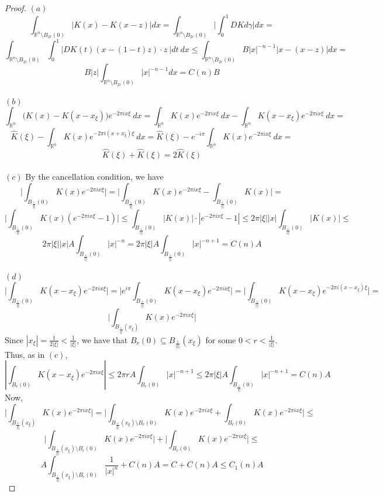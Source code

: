 \documentclass[12pt]{article}
\begin{document}
\begin{proof}
  $(a)$
  $$\int_{\mathbb{R}^n \setminus B_{2r}(0)} |K(x) - K(x-z)| dx = \int_{\mathbb{R}^n \setminus B_{2r}(0)} \Big| \int_{0}^{1} DK d\gamma \Big| dx =$$
  $$\int_{\mathbb{R}^n \setminus B_{2r}(0)} \int_{0}^{1} \Big|DK(t)(x-(1-t)z) \cdot z\ \Big| dt\ dx \le \int_{\mathbb{R}^n \setminus B_{2r}(0)} B |x|^{-n-1} |x - (x-z)| dx =$$
  $$B |z| \int_{\mathbb{R}^n \setminus B_{2r}(0)} |x|^{-n-1}dx = C(n)B$$\\
  $(b)$
  $$\int_{\mathbb{R}^n} \Big( K(x) - K(x - x_{\xi}) \Big) e^{-2 \pi i x \xi}\ dx = \int_{\mathbb{R}^n} K(x) e^{-2 \pi i x \xi}\ dx - \int_{\mathbb{R}^n} K(x-x_\xi) e^{-2 \pi i x \xi}\ dx =$$
  $$\hat{K}(\xi) - \int_{\mathbb{R}^n} K(x) e^{-2 \pi i (x + x_\xi) \xi}\ dx = \hat{K}(\xi) - e^{-i \pi} \int_{\mathbb{R}^n} K(x) e^{-2 \pi i x \xi}\ dx =$$
  $$\hat{K}(\xi) + \hat{K}(\xi) = 2 \hat{K}(\xi)$$\\
  $(c)$ By the  cancellation condition, we have
  $$\Big| \int_{B_\frac{1}{|\xi|}(0)} K(x)e^{-2 \pi i x \xi} \Big| = \Big| \int_{B_\frac{1}{|\xi|}(0)} K(x)e^{-2 \pi i x \xi} - \int_{B_\frac{1}{|\xi|}(0)} K(x) \Big| =$$
  $$\Big| \int_{B_\frac{1}{|\xi|}(0)} K(x)(e^{-2 \pi i x \xi} - 1) \Big| \le \int_{B_\frac{1}{|\xi|}(0)} |K(x)|\cdot |e^{-2 \pi i x \xi} - 1| \le 2\pi|\xi||x| \int_{B_\frac{1}{|\xi|}(0)} |K(x)| \le$$
  $$2\pi|\xi||x| A \int_{B_\frac{1}{|\xi|}(0)} |x|^{-n} = 2\pi|\xi| A \int_{B_\frac{1}{|\xi|}(0)} |x|^{-n+1} = C(n)A$$\\
  $(d)$
  $$\Big| \int_{B_\frac{1}{|\xi|}(0)} K(x-x_\xi)e^{-2 \pi i x \xi} \Big| = \Big| e^{i\pi}\int_{B_\frac{1}{|\xi|}(0)} K(x-x_\xi)e^{-2 \pi i x \xi} \Big| = \Big| \int_{B_\frac{1}{|\xi|}(0)} K(x-x_\xi)e^{-2 \pi i (x-x_{\xi}) \xi} \Big| =$$
  $$\Big| \int_{B_{\frac{1}{|\xi|}}(x_\xi)} K(x)e^{-2 \pi i x \xi} \Big|$$
  Since $|x_\xi| = \frac{1}{2|\xi|} < \frac{1}{|\xi|}$, we have that $B_{r}(0) \subseteq B_{\frac{1}{|\xi|}}(x_\xi)$ for some $0 < r < \frac{1}{|\xi|}$. Thus, as in $(c)$,
  $$|\int_{B_r(0)} K(x-x_\xi)e^{-2 \pi i x \xi}| \le 2\pi r A \int_{B_r(0)} |x|^{-n+1} \le 2\pi|\xi| A \int_{B_\frac{1}{|\xi|}(0)} |x|^{-n+1} = C(n)A$$
  Now,
  $$\Big| \int_{B_{\frac{1}{|\xi|}}(x_\xi)} K(x)e^{-2 \pi i x \xi} \Big| = \Big| \int_{B_{\frac{1}{|\xi|}}(x_\xi) \setminus B_r(0)} K(x)e^{-2 \pi i x \xi} + \int_{B_r(0)} K(x)e^{-2 \pi i x \xi} \Big| \le$$
  $$\Big| \int_{B_{\frac{1}{|\xi|}}(x_\xi) \setminus B_r(0)} K(x)e^{-2 \pi i x \xi}\Big| + \Big|\int_{B_r(0)} K(x)e^{-2 \pi i x \xi} \Big| \le$$ $$A\int_{B_{\frac{1}{|\xi|}}(x_\xi) \setminus B_r(0)} \frac{1}{|x|^n} + C(n)A = C + C(n)A \le C_1(n)A$$

\end{proof}
\end{document}
